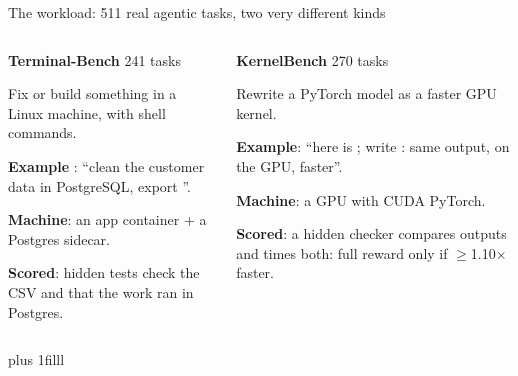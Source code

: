 \begin{frame}{The workload: 511 real agentic tasks, two very different kinds}
\begin{columns}[T]
\colorbox{panel}{\parbox[t][44mm]{\dimexpr\linewidth-2\fboxsep}{\raggedright\vspace{1.5mm}
{\large\bfseries\textcolor{awsteal}{Terminal-Bench}} {\small 241 tasks}\par\vspace{1mm}
\small Fix or build something in a Linux machine, with shell commands.\par\vspace{2mm}
\textbf{Example} : ``clean the customer data in PostgreSQL, export ''.\par\vspace{2mm}
\textbf{Machine}: an app container + a Postgres sidecar.\par\vspace{1mm}
\textbf{Scored}: hidden tests check the CSV and that the work ran in Postgres.}}
\colorbox{panel}{\parbox[t][44mm]{\dimexpr\linewidth-2\fboxsep}{\raggedright\vspace{1.5mm}
{\large\bfseries\textcolor{awsteal}{KernelBench}} {\small 270 tasks}\par\vspace{1mm}
\small Rewrite a PyTorch model as a faster GPU kernel.\par\vspace{2mm}
\textbf{Example}: ``here is ; write : same output, on the GPU, faster''.\par\vspace{2mm}
\textbf{Machine}: a GPU with CUDA PyTorch.\par\vspace{1mm}
\textbf{Scored}: a hidden checker compares outputs and times both: full reward only if $\ge$1.10$\times$ faster.}}
\end{columns}
\par\vskip 0pt plus 1filll
\end{frame}

